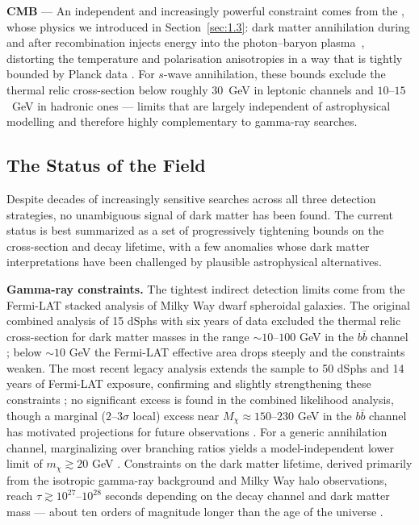 \textbf{CMB} --- An independent and increasingly powerful constraint comes from the \CMB, whose physics we introduced in Section~\ref{sec:1.3}: dark matter annihilation during and after recombination injects energy into the photon--baryon plasma~\cite{Lopez-Honorez:2013cua}, distorting the temperature and polarisation anisotropies in a way that is tightly bounded by Planck data \cite{Aghanim:2018eyx}.
For $s$-wave annihilation, these bounds exclude the thermal relic cross-section below roughly $30$~GeV in leptonic channels and $10$--$15$~GeV in hadronic ones \cite{Lopez-Honorez:2013cua, Aghanim:2018eyx} --- limits that are largely independent of astrophysical modelling and therefore highly complementary to gamma-ray searches.


\subsection{The Status of the Field}
\label{sec:status}

Despite decades of increasingly sensitive searches across all three detection strategies, no unambiguous signal of dark matter has been found.
The current status is best summarized as a set of progressively tightening bounds on the cross-section and decay lifetime, with a few anomalies whose dark matter interpretations have been challenged by plausible astrophysical alternatives.

\textbf{Gamma-ray constraints.}
The tightest indirect detection limits come from the Fermi-LAT stacked analysis of Milky Way dwarf spheroidal galaxies.
The original combined analysis of 15 dSphs with six years of data excluded the thermal relic cross-section for dark matter masses in the range $\sim 10$--$100$ GeV in the $b\bar{b}$ channel \cite{Fermi-LAT:2015att}; below $\sim 10$ GeV the Fermi-LAT effective area drops steeply and the constraints weaken.
The most recent legacy analysis extends the sample to 50 dSphs and 14 years of Fermi-LAT exposure, confirming and slightly strengthening these constraints \cite{2024PhRvD.109f3024M}; no significant excess is found in the combined likelihood analysis, though a marginal ($2$--$3\sigma$ local) excess near $M_\chi \approx 150$--$230$ GeV in the $b\bar{b}$ channel has motivated projections for future observations \cite{2024PhRvD.109f3024M}.
For a generic annihilation channel, marginalizing over branching ratios yields a model-independent lower limit of $m_\chi \gtrsim 20$ GeV \cite{Cirelli:2024ssz}.
Constraints on the dark matter lifetime, derived primarily from the isotropic gamma-ray background and Milky Way halo observations, reach $\tau \gtrsim 10^{27}$--$10^{28}$ seconds depending on the decay channel and dark matter mass --- about ten orders of magnitude longer than the age of the universe \cite{Cohen:2016uyg,Blanco_2019}.

